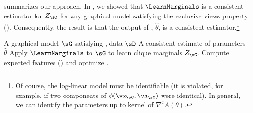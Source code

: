 
%

 summarizes our approach.
In , we showed that $\LearnMarginals$ is a consistent
estimator for $Z_\sC$ for any graphical model satisfying the exclusive views property (). 
Consequently, the result is that the output of ,
$\hat\theta$, is a consistent estimator.\footnote{Of course, the log-linear model must be identifiable
(it is violated, for example, if two components of $\phi(\vx_\sC, \vh_\sC)$ were identical).
In general, we can identify the parameters up to kernel of $\nabla^2 A(\theta)$.}

\renewcommand{\algorithmicrequire}{\textbf{Input:}}
\renewcommand{\algorithmicensure}{\textbf{Output:}}
\begin{algorithm}
  \caption{\LearnLogLinear}
  \label{algo:undirected}
  \begin{algorithmic}
    \REQUIRE A graphical model $\sG$ satisfying , data $\sD$
    \ENSURE A consistent estimate of parameters $\hat \theta$
      \STATE Apply $\LearnMarginals$ to $\sG$ to learn clique marginals $Z_\sC$.
      \STATE Compute expected features () and optimize .
  \end{algorithmic}
\end{algorithm}

